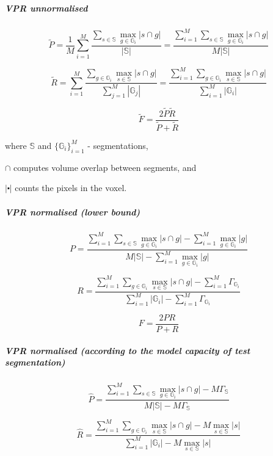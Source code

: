 \subparagraph*{VPR unnormalised}

\[
\tilde{P}=\frac{1}{M}\sum\limits _{i=1}^{M}\frac{\sum\limits _{s\in\mathbb{S}}\max\limits _{g\in\mathbb{G}_{i}}\left|s\cap g\right|}{\left|\mathbb{S}\right|}=\frac{\sum\limits _{i=1}^{M}\sum\limits _{s\in\mathbb{S}}\max\limits _{g\in\mathbb{G}_{i}}\left|s\cap g\right|}{M\left|\mathbb{S}\right|}
\]

\[
\tilde{R}=\sum\limits _{i=1}^{M}\frac{\sum\limits _{g\in\mathbb{G}_{i}}\max\limits _{s\in\mathbb{S}}\left|s\cap g\right|}{\sum\limits _{j=1}^{M}\left|\mathbb{G}_{j}\right|}=\frac{\sum\limits _{i=1}^{M}\sum\limits _{g\in\mathbb{G}_{i}}\max\limits _{s\in\mathbb{S}}\left|s\cap g\right|}{\sum\limits _{i=1}^{M}\left|\mathbb{G}_{i}\right|}
\]


\[
\tilde{F}=\frac{2\tilde{P}\tilde{R}}{\tilde{P}+\tilde{R}}
\]

where $\mathbb{S}$ and $\{\mathbb{G}_{i}\}_{i=1}^{M}$ - segmentations,

$\cap$ computes volume overlap between segments, and 

$\left|\centerdot\right|$ counts the pixels in the voxel.

\subparagraph*{VPR normalised (lower bound)}

\[
P=\frac{\sum\limits _{i=1}^{M}\sum\limits _{s\in\mathbb{S}}\max\limits _{g\in\mathbb{G}_{i}}\left|s\cap g\right|-\boxed{\sum\limits _{i=1}^{M}\max\limits _{g\in\mathbb{G}_{i}}\left|g\right|}}{M\left|\mathbb{S}\right|-\boxed{\sum\limits _{i=1}^{M}\max\limits _{g\in\mathbb{G}_{i}}\left|g\right|}}
\]

\[
R=\frac{\sum\limits _{i=1}^{M}\sum\limits _{g\in\mathbb{G}_{i}}\max\limits _{s\in\mathbb{S}}\left|s\cap g\right|-\boxed{\sum\limits _{i=1}^{M}\Gamma_{\mathbb{G}_{i}}}}{\sum\limits _{i=1}^{M}\left|\mathbb{G}_{i}\right|-\boxed{\sum\limits _{i=1}^{M}\Gamma_{\mathbb{G}_{i}}}}
\]

\[
F=\frac{2PR}{P+R}
\]


\subparagraph*{VPR normalised (according to the model capacity of test segmentation)} %

\[
\hat{P}=\frac{\sum\limits _{i=1}^{M}\sum\limits _{s\in\mathbb{S}}\max\limits _{g\in\mathbb{G}_{i}}\left|s\cap g\right|-\boxed{M\Gamma_{\mathbb{S}}}}{M\left|\mathbb{S}\right|-\boxed{M\Gamma_{\mathbb{S}}}}
\]

\[
\hat{{R}}=\frac{\sum\limits _{i=1}^{M}\sum\limits _{g\in\mathbb{G}_{i}}\max\limits _{s\in\mathbb{S}}\left|s\cap g\right|-\boxed{M\max_{s\in\mathbb{S}}\left|s\right|}}{\sum\limits _{i=1}^{M}\left|\mathbb{G}_{i}\right|-\boxed{M\max_{s\in\mathbb{S}}\left|s\right|}}
\]

